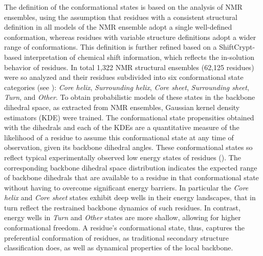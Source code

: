 The definition of the conformational states is based on the analysis of NMR ensembles, using the assumption that residues with a consistent structural definition in all models of the NMR ensemble adopt a single well-defined conformation, whereas residues with variable structure definitions adopt a wider range of conformations. This definition is further refined based on a ShiftCrypt-based interpretation of chemical shift information, which reflects the in-solution behavior of residues. In total 1,322 NMR structural ensembles (62,125 residues) were so analyzed and their residues subdivided into six conformational state categories (see ):  \textit{Core helix}, \textit{Surrounding helix}, \textit{Core sheet}, \textit{Surrounding sheet}, \textit{Turn}, and \textit{Other}. To obtain probabilistic models of these states in the backbone dihedral space, as extracted from NMR ensembles, Gaussian kernel density estimators (KDE) were trained. The conformational state propensities obtained with the dihedrals and each of the KDEs are a quantitative measure of the likelihood of a residue to assume this conformational state at any time of observation, given its backbone dihedral angles. These conformational states so reflect typical experimentally observed low energy states of residues (). The corresponding backbone dihedral space distribution indicates the expected range of backbone dihedrals that are available to a residue in that conformational state without having to overcome significant energy barriers. In particular the \textit{Core helix} and \textit{Core sheet} states exhibit deep wells in their energy landscapes, that in turn reflect the restrained backbone dynamics of such residues. In contrast, energy wells in \textit{Turn} and \textit{Other} states are more shallow, allowing for higher conformational freedom. A residue's conformational state, thus, captures the preferential conformation of residues, as traditional secondary structure classification does, as well as dynamical properties of the local backbone.

